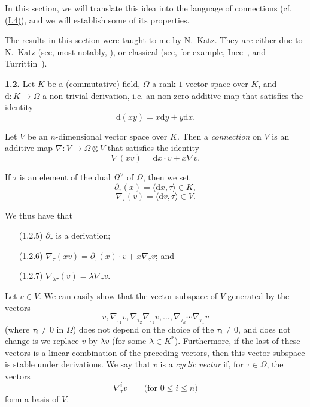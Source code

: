 \documentclass{report}
\newenvironment{rmenv}[1]
  {\phantomsection\par\medskip\noindent\textbf{#1.}\rmfamily}
  {\par\medskip}
\newcommand{\dd}{\mathrm{d}}
\renewcommand{\leq}{\leqslant}
\newcommand{\oldpage}[1]{\marginpar{\footnotesize$\Big\vert$ \textit{p.~#1}}}
\begin{document}
In this section, we will translate this idea into the language of connections (cf. \hyperref[I.4]{(I.4)}), and we will establish some of its properties.

The results in this section were taught to me by N.~Katz.
They are either due to N.~Katz (see, most notably, \cite{14,15}), or classical (see, for example, Ince~\cite{13}, and Turrittin~\cite{25,26}).

\begin{rmenv}{1.2}
\label{II.1.2}
  Let $K$ be a (commutative) field, $\Omega$ a rank-$1$ vector space over $K$, and $\dd\colon K\to\Omega$ a non-trivial derivation, i.e. an non-zero additive map that satisfies the identity
  \[
  \label{II.1.2.1}
    \dd(xy) = x\dd y + y\dd x.
  \tag{1.2.1}
  \]

  Let $V$ be an $n$-dimensional vector space over $K$.
  Then a \emph{connection} on $V$ is an additive map $\nabla\colon V\to\Omega\otimes V$ that satisfies the identity
  \[
  \label{II.1.2.2}
    \nabla(xv) = \dd x\cdot v + x\nabla v.
  \tag{1.2.2}
  \]

  If $\tau$ is an element of the dual $\Omega^\vee$ of $\Omega$, then we set
  \[
  \label{II.1.2.3}
    \partial_\tau(x) = \langle\dd x,\tau\rangle \in K,
  \tag{1.2.3}
  \]
  \[
  \label{II.1.2.4}
    \nabla_\tau(v) = \langle\dd v,\tau\rangle \in V.
  \tag{1.2.4}
  \]

\oldpage{42}
  We thus have that
  \begin{enumerate}
    \item[(1.2.5)] \label{II.1.2.5}
      $\partial_\tau$ is a derivation;
    \item[(1.2.6)] \label{II.1.2.6}
      $\nabla_\tau(xv) = \partial_\tau(x)\cdot v + x\nabla_\tau v$; and
    \item[(1.2.7)] \label{II.1.2.7}
      $\nabla_{\lambda\tau}(v) = \lambda\nabla_\tau v$.
  \end{enumerate}

  Let $v\in V$.
  We can easily show that the vector subspace of $V$ generated by the vectors
  \[
    v, \nabla_{\tau_1}v, \nabla_{\tau_2}\nabla_{\tau_1}v, \ldots, \nabla_{\tau_k}\cdots\nabla_{\tau_1} v
  \]
  (where $\tau_i\neq0$ in $\Omega$) does not depend on the choice of the $\tau_i\neq0$, and does not change is we replace $v$ by $\lambda v$ (for some $\lambda\in K^*$).
  Furthermore, if the last of these vectors is a linear combination of the preceding vectors, then this vector subspace is stable under derivations.
  We say that $v$ is a \emph{cyclic vector} if, for $\tau\in\Omega$, the vectors
  \[
    \nabla_\tau^i v
    \qquad\mbox{(for $0\leq i\leq n$)}
  \]
  form a basis of $V$.
\end{rmenv}
\end{document}
